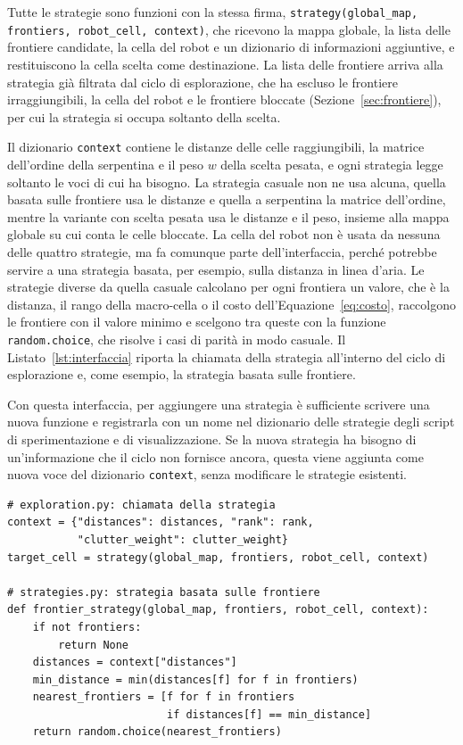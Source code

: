 Tutte le strategie sono funzioni con la stessa firma, \texttt{strategy(global\_map, frontiers, robot\_cell, context)}, che ricevono la mappa globale, la lista delle frontiere candidate, la cella del robot e un dizionario di informazioni aggiuntive, e restituiscono la cella scelta come destinazione. La lista delle frontiere arriva alla strategia già filtrata dal ciclo di esplorazione, che ha escluso le frontiere irraggiungibili, la cella del robot e le frontiere bloccate (Sezione~\ref{sec:frontiere}), per cui la strategia si occupa soltanto della scelta.

Il dizionario \texttt{context} contiene le distanze delle celle raggiungibili, la matrice dell'ordine della serpentina e il peso $w$ della scelta pesata, e ogni strategia legge soltanto le voci di cui ha bisogno. La strategia casuale non ne usa alcuna, quella basata sulle frontiere usa le distanze e quella a serpentina la matrice dell'ordine, mentre la variante con scelta pesata usa le distanze e il peso, insieme alla mappa globale su cui conta le celle bloccate. La cella del robot non è usata da nessuna delle quattro strategie, ma fa comunque parte dell'interfaccia, perché potrebbe servire a una strategia basata, per esempio, sulla distanza in linea d'aria. Le strategie diverse da quella casuale calcolano per ogni frontiera un valore, che è la distanza, il rango della macro-cella o il costo dell'Equazione~\eqref{eq:costo}, raccolgono le frontiere con il valore minimo e scelgono tra queste con la funzione \texttt{random.choice}, che risolve i casi di parità in modo casuale. Il Listato~\ref{lst:interfaccia} riporta la chiamata della strategia all'interno del ciclo di esplorazione e, come esempio, la strategia basata sulle frontiere.

Con questa interfaccia, per aggiungere una strategia è sufficiente scrivere una nuova funzione e registrarla con un nome nel dizionario delle strategie degli script di sperimentazione e di visualizzazione. Se la nuova strategia ha bisogno di un'informazione che il ciclo non fornisce ancora, questa viene aggiunta come nuova voce del dizionario \texttt{context}, senza modificare le strategie esistenti.

\begin{lstlisting}[float=!htb, label=lst:interfaccia, caption={Chiamata della strategia nel ciclo di esplorazione e strategia basata sulle frontiere.}]
# exploration.py: chiamata della strategia
context = {"distances": distances, "rank": rank,
           "clutter_weight": clutter_weight}
target_cell = strategy(global_map, frontiers, robot_cell, context)

# strategies.py: strategia basata sulle frontiere
def frontier_strategy(global_map, frontiers, robot_cell, context):
    if not frontiers:
        return None
    distances = context["distances"]
    min_distance = min(distances[f] for f in frontiers)
    nearest_frontiers = [f for f in frontiers
                         if distances[f] == min_distance]
    return random.choice(nearest_frontiers)
\end{lstlisting}

